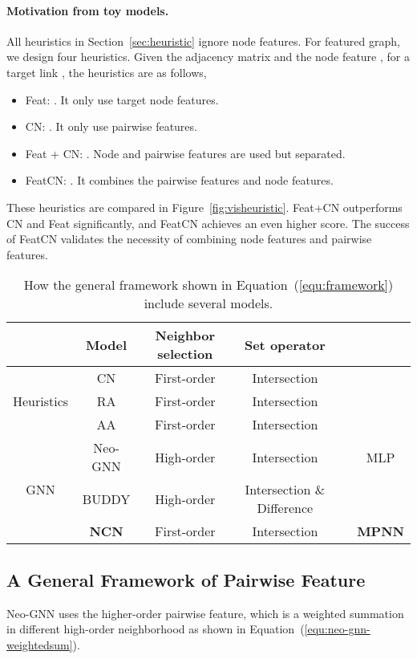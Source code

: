 \documentclass{article}
\theoremstyle{plain}
\theoremstyle{definition}
\theoremstyle{remark}
\begin{document}
\paragraph{Motivation from toy models.} All heuristics in Section~\ref{sec:heuristic} ignore node features. For featured graph, we design four heuristics. Given the adjacency matrix  and the node feature , for a target link , the heuristics are as follows,
\begin{itemize}[itemsep=0pt,topsep=0pt,parsep=0pt]
    \item Feat: . It only use target node features.
    \item CN: . It only use pairwise features.
    \item Feat + CN: . Node and pairwise features are used but separated.
    \item FeatCN: . It combines the pairwise features and node features.
\end{itemize}
These heuristics are compared in Figure~\ref{fig:visheuristic}. Feat+CN outperforms CN and Feat significantly, and FeatCN achieves an even higher score. The success of FeatCN validates the necessity of combining node features and pairwise features.
\fi

\begin{table*}[th]
    \centering
    \caption{How the general framework shown in Equation~(\ref{equ:framework}) include several models.}\label{tab:framework}
\vskip 0.15in
\begin{small}
\begin{tabular}{cccccc}
\toprule
 & Model & Neighbor selection & Set operator  &  &  \\ \midrule
\multirow{3}{*}{Heuristics} & CN & First-order & Intersection &  &  \\
 & RA & First-order & Intersection &  &  \\
 & AA & First-order & Intersection &  &  \\
 \midrule
\multirow{3}{*}{GNN} & Neo-GNN & High-order & Intersection &  & MLP \\
 & BUDDY & High-order & Intersection \& Difference &  &  \\
 & \textbf{NCN} & First-order & Intersection &  & \textbf{MPNN}\\
 \bottomrule
\end{tabular}

\end{small}
\end{table*}


\subsection{A General Framework of Pairwise Feature}
Neo-GNN uses the higher-order pairwise feature, which is a weighted summation in different high-order neighborhood as shown in Equation~(\ref{equ:neo-gnn-weightedsum}).
\end{document}
